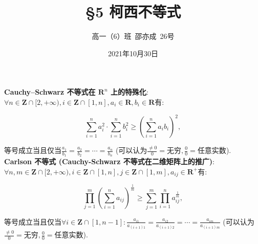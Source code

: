 \documentclass[8pt]{article}
\title{\S 5 柯西不等式}
\author{高一（6）班\ 邵亦成\ 26号}
\date{2021年10月30日}
\begin{document}
	\maketitle

	\textbf{Cauchy–Schwarz 不等式在 $\mathbf{R}^{n}$ 上的特殊化}: $\forall n \in \mathbf{Z} \cap [2, +\infty), i \in \mathbf{Z} \cap [1, n], a_i \in \mathbf{R}, b_i \in \mathbf{R}$有:

	$$
	\sum_{i=1}^{n}{a_i^2}\cdot\sum_{i=1}^{n}{b_i^2}\geq\left(\sum_{i=1}^{n}{a_i b_i}\right)^2,
	$$

	等号成立当且仅当$\displaystyle \frac{a_1}{b_1}=\frac{a_2}{b_2}=\cdots=\frac{a_n}{b_n}$ (可以认为$\displaystyle \frac{\neq 0}{0}=\text{无穷}, \frac{0}{0}=\text{任意实数}$).
	~\\

	\textbf{Carlson 不等式 (Cauchy-Schwarz 不等式在二维矩阵上的推广)}: $\forall n, m\in \mathbf{Z} \cap [2, +\infty), i \in \mathbf{Z} \cap [1, n], j \in \mathbf{Z} \cap [1, m], a_{ij} \in \mathbf{R}^{+}$有:

	$$
	\prod_{j=1}^{m}\left(\sum_{i=1}^{n}a_{ij}\right)^{\frac{1}{m}}\geq\sum_{j=1}^{m}\prod_{i=1}^{n}a_{ij}^{\frac{1}{m}},
	$$

	等号成立当且仅当$\displaystyle \forall i\in\mathbf{Z}\cap[1, n-1]: \frac{a_{i1}}{a_{(i+1)1}}=\frac{a_{i2}}{a_{(i+1)2}}=\cdots=\frac{a_{im}}{a_{(i+1)m}}$ (可以认为$\displaystyle \frac{\neq 0}{0}=\text{无穷}, \frac{0}{0}=\text{任意实数}$).

	~\\
\end{document}

